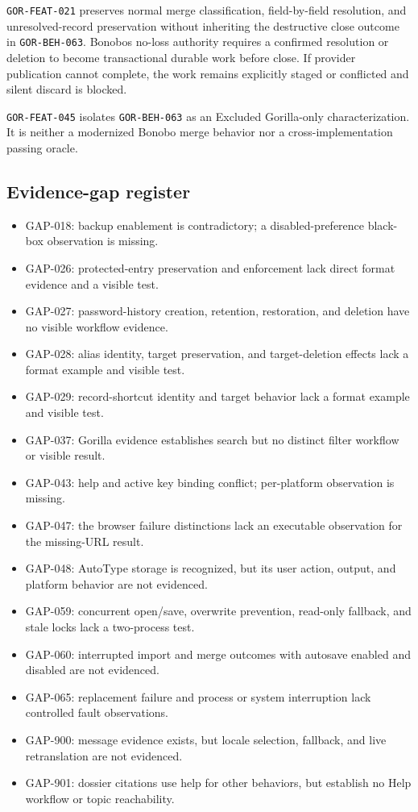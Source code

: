 \documentclass[
  letterpaper,
]{article}
\providecommand{\tightlist}{%
  \setlength{\itemsep}{0pt}\setlength{\parskip}{0pt}}
\begin{document}
\nolinkurl{GOR-FEAT-021} preserves normal merge classification, field-by-field resolution, and unresolved-record
preservation without inheriting the destructive close outcome in \nolinkurl{GOR-BEH-063}. Bonobo\textquotesingle s
no-loss authority requires a confirmed resolution or deletion to become transactional durable work before close. If
provider publication cannot complete, the work remains explicitly staged or conflicted and silent discard is blocked.

\nolinkurl{GOR-FEAT-045} isolates \nolinkurl{GOR-BEH-063} as an Excluded Gorilla-only characterization. It is neither a
modernized Bonobo merge behavior nor a cross-implementation passing oracle.

\subsection{Evidence-gap register}\label{evidence-gap-register}

\begin{itemize}
\tightlist
\item
  GAP-018: backup enablement is contradictory; a disabled-preference black-box observation is missing.
\item
  GAP-026: protected-entry preservation and enforcement lack direct format evidence and a visible test.
\item
  GAP-027: password-history creation, retention, restoration, and deletion have no visible workflow evidence.
\item
  GAP-028: alias identity, target preservation, and target-deletion effects lack a format example and visible test.
\item
  GAP-029: record-shortcut identity and target behavior lack a format example and visible test.
\item
  GAP-037: Gorilla evidence establishes search but no distinct filter workflow or visible result.
\item
  GAP-043: help and active key binding conflict; per-platform observation is missing.
\item
  GAP-047: the browser failure distinctions lack an executable observation for the missing-URL result.
\item
  GAP-048: AutoType storage is recognized, but its user action, output, and platform behavior are not evidenced.
\item
  GAP-059: concurrent open/save, overwrite prevention, read-only fallback, and stale locks lack a two-process test.
\item
  GAP-060: interrupted import and merge outcomes with autosave enabled and disabled are not evidenced.
\item
  GAP-065: replacement failure and process or system interruption lack controlled fault observations.
\item
  GAP-900: message evidence exists, but locale selection, fallback, and live retranslation are not evidenced.
\item
  GAP-901: dossier citations use help for other behaviors, but establish no Help workflow or topic reachability.
\end{itemize}
\end{document}
